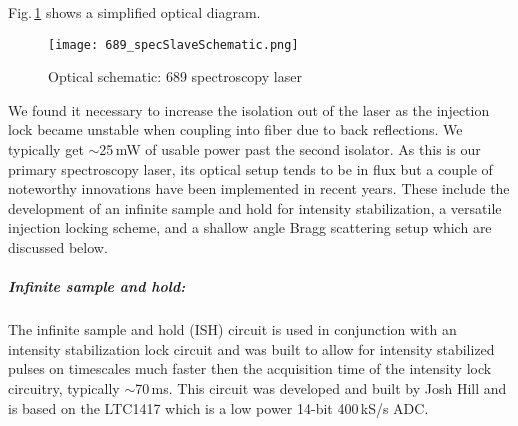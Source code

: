 Fig.\,\ref{fig:689specSch} shows a simplified optical diagram.
	\begin{figure}
	\centerline{
		\texttt{[image: 689\_specSlaveSchematic.png]}}
		\caption{Optical schematic: 689 spectroscopy laser}
		 \label{fig:689specSch}
	\end{figure}
We found it necessary to increase the isolation out of the laser as the injection lock became unstable when coupling into fiber due to back reflections.
We typically get $\sim$25\,mW of usable power past the second isolator.
As this is our primary spectroscopy laser, its optical setup tends to be in flux but a couple of noteworthy innovations have been implemented in recent years.
These include the development of an infinite sample and hold for intensity stabilization, a versatile injection locking scheme, and a shallow angle Bragg scattering setup which are discussed below.

\subparagraph{Infinite sample and hold:} \label{sec:infSH}
The infinite sample and hold (ISH) circuit is used in conjunction with an intensity stabilization lock circuit and was built to allow for intensity stabilized pulses on timescales much faster then the acquisition time of the intensity lock circuitry, typically $\sim$70\,ms.
This circuit was developed and built by Josh Hill and is based on the LTC1417 which is a low power 14-bit 400\,kS/s ADC.

